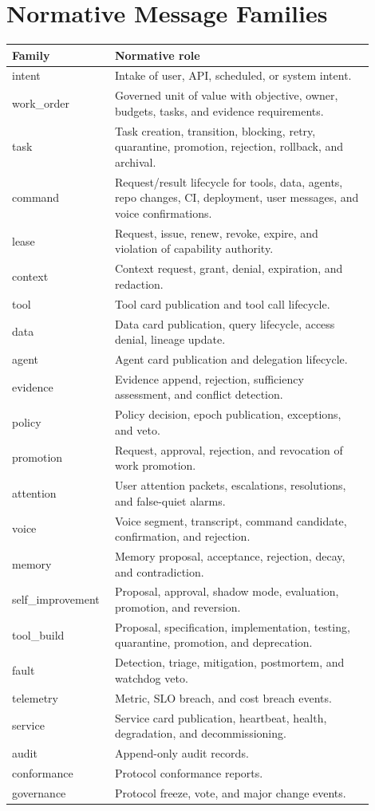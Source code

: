 \documentclass[12pt,journal,onecolumn,draftclsnofoot]{IEEEtran}
\begin{document}
\section{Normative Message Families}
\begin{longtable}{p{0.22\linewidth}p{0.68\linewidth}}
\toprule
Family & Normative role \\
\midrule
intent & Intake of user, API, scheduled, or system intent. \\
work\_order & Governed unit of value with objective, owner, budgets, tasks, and evidence requirements. \\
task & Task creation, transition, blocking, retry, quarantine, promotion, rejection, rollback, and archival. \\
command & Request/result lifecycle for tools, data, agents, repo changes, CI, deployment, user messages, and voice confirmations. \\
lease & Request, issue, renew, revoke, expire, and violation of capability authority. \\
context & Context request, grant, denial, expiration, and redaction. \\
tool & Tool card publication and tool call lifecycle. \\
data & Data card publication, query lifecycle, access denial, lineage update. \\
agent & Agent card publication and delegation lifecycle. \\
evidence & Evidence append, rejection, sufficiency assessment, and conflict detection. \\
policy & Policy decision, epoch publication, exceptions, and veto. \\
promotion & Request, approval, rejection, and revocation of work promotion. \\
attention & User attention packets, escalations, resolutions, and false-quiet alarms. \\
voice & Voice segment, transcript, command candidate, confirmation, and rejection. \\
memory & Memory proposal, acceptance, rejection, decay, and contradiction. \\
self\_improvement & Proposal, approval, shadow mode, evaluation, promotion, and reversion. \\
tool\_build & Proposal, specification, implementation, testing, quarantine, promotion, and deprecation. \\
fault & Detection, triage, mitigation, postmortem, and watchdog veto. \\
telemetry & Metric, SLO breach, and cost breach events. \\
service & Service card publication, heartbeat, health, degradation, and decommissioning. \\
audit & Append-only audit records. \\
conformance & Protocol conformance reports. \\
governance & Protocol freeze, vote, and major change events. \\
\bottomrule
\end{longtable}
\end{document}
